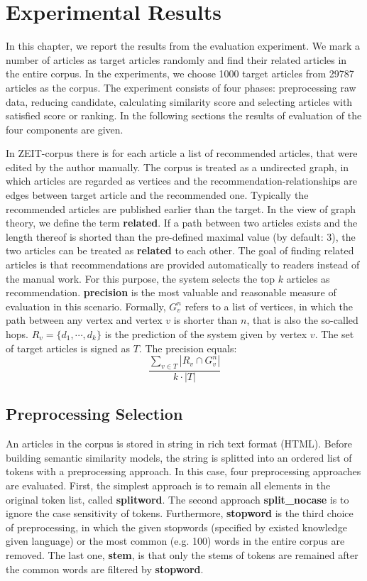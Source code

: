
\section{Experimental Results}


In this chapter, we report the results from the evaluation experiment. We mark a number of articles as target articles randomly and find their related articles in the entire corpus. In the experiments, we choose 1000 target articles from 29787 articles as the corpus. The experiment consists of four phases: preprocessing raw data, reducing candidate, calculating similarity score and selecting articles with satisfied score or ranking. In the following sections the results of evaluation of the four components are given. 

In ZEIT-corpus there is for each article a list of recommended articles, that were edited by the author manually. The corpus is treated as a undirected graph, in which articles are regarded as vertices and the recommendation-relationships are edges between target article and the recommended one. Typically the recommended articles are published earlier than the target. In the view of graph theory, we define the term \textbf{related}. If a path between two articles exists and the length thereof is shorted than the pre-defined maximal value (by default: 3), the two articles can be treated as \textbf{related} to each other. The goal of finding related articles is that recommendations are provided automatically to readers instead of the manual work. For this purpose, the system selects the top $k$ articles as recommendation. \textbf{precision} is the most valuable and reasonable measure of evaluation in this scenario. Formally, $G_v^n$ refers to a list of vertices, in which the path between any vertex and vertex $v$ is shorter than $n$, that is also the so-called hops. $R_v=\{d_1, \cdots, d_k\}$ is the prediction of the system given by vertex $v$. The set of target articles is signed as $T$. The precision equals:
$$\frac{\sum_{v\in T}|R_v \cap G_v^n|}{k \cdot |T|}$$


\subsection{Preprocessing Selection}

An articles in the corpus is stored in string in rich text format (HTML). Before building semantic similarity models, the string is splitted into an ordered list of tokens with a preprocessing approach. In this case, four preprocessing approaches are evaluated. First, the simplest approach is to remain all elements in the original token list, called \textbf{splitword}. The second approach \textbf{split\_nocase} is to ignore the case sensitivity of tokens. Furthermore, \textbf{stopword} is the third choice of preprocessing, in which the given stopwords (specified by existed knowledge given language) or the most common (e.g. 100) words in the entire corpus are removed. The last one, \textbf{stem}, is that only the stems of tokens are remained after the common words are filtered by \textbf{stopword}. 

